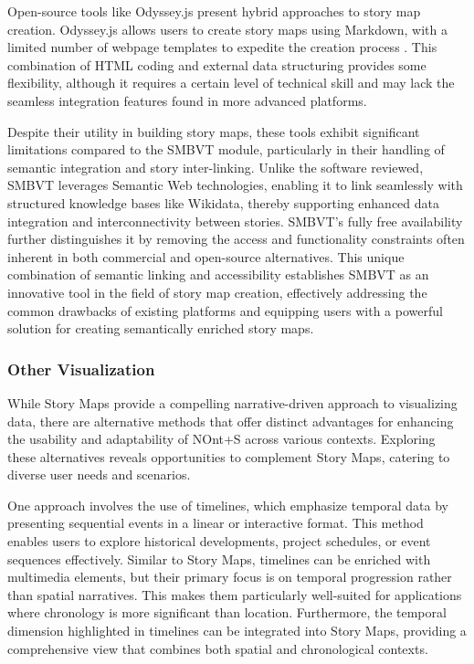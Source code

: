 Open-source tools like Odyssey.js present hybrid approaches to story map creation. Odyssey.js allows users to create story maps using Markdown, with a limited number of webpage templates to expedite the creation process \cite{Odysseyjs}. This combination of HTML coding and external data structuring provides some flexibility, although it requires a certain level of technical skill and may lack the seamless integration features found in more advanced platforms.

Despite their utility in building story maps, these tools exhibit significant limitations compared to the SMBVT module, particularly in their handling of semantic integration and story inter-linking. Unlike the software reviewed, SMBVT leverages Semantic Web technologies, enabling it to link seamlessly with structured knowledge bases like Wikidata, thereby supporting enhanced data integration and interconnectivity between stories. SMBVT’s fully free availability further distinguishes it by removing the access and functionality constraints often inherent in both commercial and open-source alternatives. This unique combination of semantic linking and accessibility establishes SMBVT as an innovative tool in the field of story map creation, effectively addressing the common drawbacks of existing platforms and equipping users with a powerful solution for creating semantically enriched story maps.

\subsubsection{Other Visualization}

While Story Maps provide a compelling narrative-driven approach to visualizing data, there are alternative methods that offer distinct advantages for enhancing the usability and adaptability of NOnt+S across various contexts. Exploring these alternatives reveals opportunities to complement Story Maps, catering to diverse user needs and scenarios.

One approach involves the use of timelines, which emphasize temporal data by presenting sequential events in a linear or interactive format. This method enables users to explore historical developments, project schedules, or event sequences effectively. Similar to Story Maps, timelines can be enriched with multimedia elements, but their primary focus is on temporal progression rather than spatial narratives. This makes them particularly well-suited for applications where chronology is more significant than location. Furthermore, the temporal dimension highlighted in timelines can be integrated into Story Maps, providing a comprehensive view that combines both spatial and chronological contexts.

